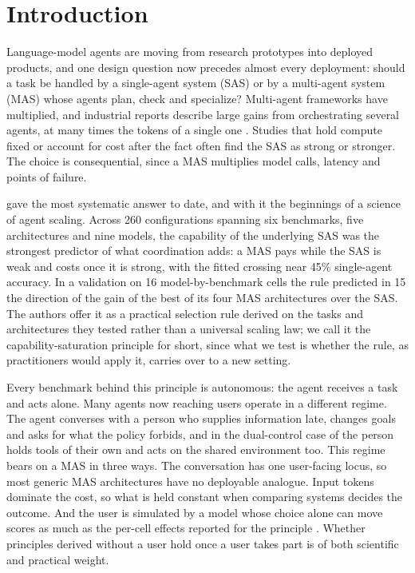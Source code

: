 \section{Introduction}
\label{sec:intro}

Language-model agents are moving from research prototypes into deployed products, and one design question now precedes almost every deployment: should a task be handled by a single-agent system (SAS) or by a multi-agent system (MAS) whose agents plan, check and specialize? Multi-agent frameworks have multiplied, and industrial reports describe large gains from orchestrating several agents, at many times the tokens of a single one \citep{anthropic2025multiagent}. Studies that hold compute fixed \citep{tran2026single} or account for cost after the fact \citep{jwalapuram2026illusion} often find the SAS as strong or stronger. The choice is consequential, since a MAS multiplies model calls, latency and points of failure.

\citet{kim2026capable} gave the most systematic answer to date, and with it the beginnings of a science of agent scaling. Across 260 configurations spanning six benchmarks, five architectures and nine models, the capability of the underlying SAS was the strongest predictor of what coordination adds: a MAS pays while the SAS is weak and costs once it is strong, with the fitted crossing near 45\% single-agent accuracy. In a validation on 16 model-by-benchmark cells the rule predicted in 15 the direction of the gain of the best of its four MAS architectures over the SAS. The authors offer it as a practical selection rule derived on the tasks and architectures they tested rather than a universal scaling law; we call it the capability-saturation principle for short, since what we test is whether the rule, as practitioners would apply it, carries over to a new setting.

Every benchmark behind this principle is autonomous: the agent receives a task and acts alone. Many agents now reaching users operate in a different regime. The agent converses with a person who supplies information late, changes goals and asks for what the policy forbids, and in the dual-control case of \citet{barres2025tau2} the person holds tools of their own and acts on the shared environment too. This regime bears on a MAS in three ways. The conversation has one user-facing locus, so most generic MAS architectures have no deployable analogue. Input tokens dominate the cost, so what is held constant when comparing systems decides the outcome. And the user is simulated by a model whose choice alone can move scores as much as the per-cell effects reported for the principle \citep{seshadri2026lost,zhou2026sim2real}. Whether principles derived without a user hold once a user takes part is of both scientific and practical weight.

